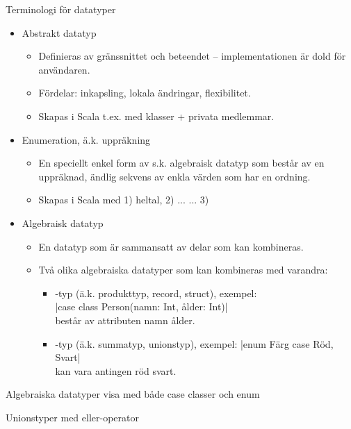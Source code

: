 
\begin{Slide}{Terminologi för datatyper}\SlideFontSmall
\begin{itemize}
\item Abstrakt datatyp 
\begin{itemize}\SlideFontTiny
\item Definieras av gränssnittet och beteendet -- implementationen är dold för användaren. 
\item Fördelar: inkapsling, lokala ändringar, flexibilitet.
\item Skapas i Scala t.ex. med klasser + privata medlemmar.
\end{itemize} 
\item Enumeration, ä.k. uppräkning 
\begin{itemize}\SlideFontTiny
\item En speciellt enkel form av s.k. algebraisk datatyp som består av en uppräknad, ändlig sekvens av enkla värden som har en ordning.
\item Skapas i Scala med 1) heltal, 2)  ...  ... 3) 
\end{itemize} 
\item Algebraisk datatyp 
\begin{itemize}\SlideFontTiny
\item En datatyp som är sammansatt av delar som kan kombineras. 
\item Två olika algebraiska datatyper som kan kombineras med varandra:
\begin{itemize}\SlideFontTiny
\item {}-typ (ä.k. produkttyp, record, struct), exempel: \\ \code|case class Person(namn: Int, ålder: Int)| \\består av attributen namn  ålder.
\item {}-typ (ä.k. summatyp, unionstyp), exempel: \code|enum Färg { case Röd, Svart}| \\kan vara antingen röd  svart.
\end{itemize}  
\end{itemize} 
\end{itemize}     
\end{Slide}


\begin{Slide}{Algebraiska datatyper}
     \TODO visa med både case classer och enum
\end{Slide}

\begin{Slide}{Unionstyper med eller-operator}
     \TODO
\end{Slide}